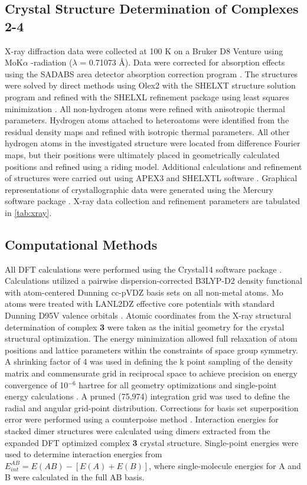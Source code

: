 \subsection{Crystal Structure Determination of Complexes \textbf{2}-\textbf{4}}
X-ray diffraction data were collected at 100 K on a Bruker D8 Venture using MoK$\alpha$ -radiation ($\lambda$ = 0.71073 \AA). Data were corrected for absorption effects using the SADABS area detector absorption correction program \citep{Sheldrick1996}. The structures were solved by direct methods using Olex2 with the SHELXT structure solution program and refined with the SHELXL refinement package using least squares minimization \citep{Dolomanov2009, Sheldrick2015, Sheldrick2015a}. All non-hydrogen atoms were refined with anisotropic thermal parameters. Hydrogen atoms attached to heteroatoms were identified from the residual density maps and refined with isotropic thermal parameters. All other hydrogen atoms in the investigated structure were located from difference Fourier maps, but their positions were ultimately placed in geometrically calculated positions and refined using a riding model. Additional calculations and refinement of structures were carried out using APEX3 and SHELXTL software \citep{Sheldrick2008, Bruker2016}. Graphical representations of crystallographic data were generated using the Mercury software package \citep{Macrae2008a}. X-ray data collection and refinement parameters are tabulated in \autoref{tab:xray}.   

\subsection{Computational Methods}
All DFT calculations were performed using the Crystal14 software package \citep{Dovesi2014b, Dovesi2016}. Calculations utilized a pairwise dispersion-corrected B3LYP-D2 density functional with atom-centered Dunning cc-pVDZ basis sets on all non-metal atoms\citep{Becke1993c, Grimme2004a, Grimme2006, Lee1988, Dunning1989}. Mo atoms were treated with LANL2DZ effective core potentials with standard Dunning D95V valence orbitals \citep{Dunning1977, Hay1985}. Atomic coordinates from the X-ray structural determination of complex \textbf{3} were taken as the initial geometry for the crystal structural optimization. The energy minimization allowed full relaxation of atom positions and lattice parameters within the constraints of space group symmetry. A shrinking factor of 4 was used in defining the k point sampling of the density matrix and commensurate grid in reciprocal space to achieve precision on energy convergence of 10$^{-6}$ hartree for all geometry optimizations and single-point energy calculations \citep{Gilat1972, Monkhorst1976a}. A pruned (75,974) integration grid was used to define the radial and angular grid-point distribution. Corrections for basis set superposition error were performed using a counterpoise method \citep{Boys1970}. Interaction energies for stacked dimer structures were calculated using dimers extracted from the expanded DFT optimized complex \textbf{3} crystal structure. Single-point energies were used to determine interaction energies from $E_{int}^{AB}=E(AB)-[E(A)+E(B)]$, where single-molecule energies for A and B were calculated in the full AB basis. 

